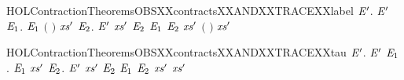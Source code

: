 \begin{SaveVerbatim}{HOLContractionTheoremsOBSXXcontractsXXANDXXTRACEXXlabel}
\HOLTokenTurnstile{} \HOLSymConst{\HOLTokenForall{}} \ensuremath{\HOLBoundVar{E}\sp{\prime{}}}.
       \ensuremath{\HOLBoundVar{E}\sp{\prime{}}} \HOLSymConst{\HOLTokenImp{}}
     \HOLSymConst{\HOLTokenForall{}}  \ensuremath{\HOLBoundVar{E}\sb{\mathrm{1}}}.
          \ensuremath{\HOLBoundVar{E}\sb{\mathrm{1}}} \HOLSymConst{\HOLTokenConj{}}  \ensuremath{(} \ensuremath{)}  \HOLSymConst{\HOLTokenImp{}}
       \HOLSymConst{\HOLTokenExists{}}\ensuremath{\HOLBoundVar{xs}\sp{\prime{}}} \ensuremath{\HOLBoundVar{E}\sb{\mathrm{2}}}.
          \ensuremath{\HOLBoundVar{E}\sp{\prime{}}} \ensuremath{\HOLBoundVar{xs}\sp{\prime{}}} \ensuremath{\HOLBoundVar{E}\sb{\mathrm{2}}} \HOLSymConst{\HOLTokenConj{}} \ensuremath{\HOLBoundVar{E}\sb{\mathrm{1}}}  \ensuremath{\HOLBoundVar{E}\sb{\mathrm{2}}} \HOLSymConst{\HOLTokenConj{}}
          \ensuremath{\HOLBoundVar{xs}\sp{\prime{}}} \HOLSymConst{\HOLTokenLeq{}}   \HOLSymConst{\HOLTokenConj{}}  \ensuremath{(} \ensuremath{)} \ensuremath{\HOLBoundVar{xs}\sp{\prime{}}}
\end{SaveVerbatim}
\newcommand{\HOLContractionTheoremsOBSXXcontractsXXANDXXTRACEXXlabel}{\UseVerbatim{HOLContractionTheoremsOBSXXcontractsXXANDXXTRACEXXlabel}}
\begin{SaveVerbatim}{HOLContractionTheoremsOBSXXcontractsXXANDXXTRACEXXtau}
\HOLTokenTurnstile{} \HOLSymConst{\HOLTokenForall{}} \ensuremath{\HOLBoundVar{E}\sp{\prime{}}}.
       \ensuremath{\HOLBoundVar{E}\sp{\prime{}}} \HOLSymConst{\HOLTokenImp{}}
     \HOLSymConst{\HOLTokenForall{}} \ensuremath{\HOLBoundVar{E}\sb{\mathrm{1}}}.
          \ensuremath{\HOLBoundVar{E}\sb{\mathrm{1}}} \HOLSymConst{\HOLTokenConj{}}   \HOLSymConst{\HOLTokenImp{}}
       \HOLSymConst{\HOLTokenExists{}}\ensuremath{\HOLBoundVar{xs}\sp{\prime{}}} \ensuremath{\HOLBoundVar{E}\sb{\mathrm{2}}}.
          \ensuremath{\HOLBoundVar{E}\sp{\prime{}}} \ensuremath{\HOLBoundVar{xs}\sp{\prime{}}} \ensuremath{\HOLBoundVar{E}\sb{\mathrm{2}}} \HOLSymConst{\HOLTokenConj{}} \ensuremath{\HOLBoundVar{E}\sb{\mathrm{1}}}  \ensuremath{\HOLBoundVar{E}\sb{\mathrm{2}}} \HOLSymConst{\HOLTokenConj{}}
          \ensuremath{\HOLBoundVar{xs}\sp{\prime{}}} \HOLSymConst{\HOLTokenLeq{}}   \HOLSymConst{\HOLTokenConj{}}  \ensuremath{\HOLBoundVar{xs}\sp{\prime{}}}
\end{SaveVerbatim}
